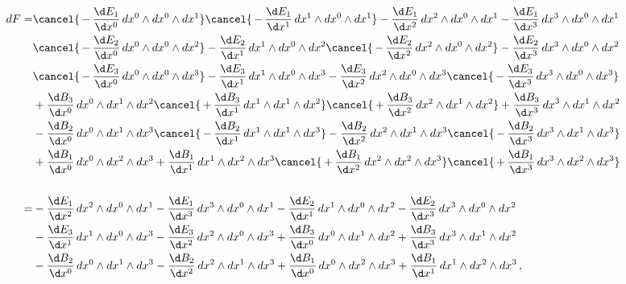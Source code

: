  \begin{align*}
 	dF =
 	&\cancel{\, - \, \frac{\d E_1}{\d x^0} \, dx^0 \wedge dx^0 \wedge dx^1} \cancel{\, - \, \frac{\d E_1}{\d x^1} \, dx^1 \wedge dx^0 \wedge dx^1}
 	 - \frac{\d E_1}{\d x^2} \, dx^2 \wedge dx^0 \wedge dx^1 - \frac{\d E_1}{\d x^3} \, dx^3 \wedge dx^0 \wedge dx^1
 	\\
 	&\cancel{\, - \, \frac{\d E_2}{\d x^0} \, dx^0 \wedge dx^0 \wedge dx^2} - \frac{\d E_2}{\d x^1} \, dx^1 \wedge dx^0 \wedge dx^2
 	 \cancel{\, - \, \frac{\d E_2}{\d x^2} \, dx^2 \wedge dx^0 \wedge dx^2} - \frac{\d E_2}{\d x^3} \, dx^3 \wedge dx^0 \wedge dx^2
 	\\
 	&\cancel{\, - \, \frac{\d E_3}{\d x^0} \, dx^0 \wedge dx^0 \wedge dx^3} - \frac{\d E_3}{\d x^1} \, dx^1 \wedge dx^0 \wedge dx^3
 	 - \frac{\d E_3}{\d x^2} \, dx^2 \wedge dx^0 \wedge dx^3 \cancel{\, - \, \frac{\d E_3}{\d x^3} \, dx^3 \wedge dx^0 \wedge dx^3}
 	\\
 	&+ \frac{\d B_3}{\d x^0} \, dx^0 \wedge dx^1 \wedge dx^2 \cancel{\, + \, \frac{\d B_3}{\d x^1} \, dx^1 \wedge dx^1 \wedge dx^2}
 	 \cancel{\, + \, \frac{\d B_3}{\d x^2} \, dx^2 \wedge dx^1 \wedge dx^2} + \frac{\d B_3}{\d x^3} \, dx^3 \wedge dx^1 \wedge dx^2
 	\\
 	&- \frac{\d B_2}{\d x^0} \, dx^0 \wedge dx^1 \wedge dx^3 \cancel{\, - \, \frac{\d B_2}{\d x^1} \, dx^1 \wedge dx^1 \wedge dx^3}
 	 - \frac{\d B_2}{\d x^2} \, dx^2 \wedge dx^1 \wedge dx^3 \cancel{\, - \, \frac{\d B_2}{\d x^3} \, dx^3 \wedge dx^1 \wedge dx^3}
 	\\
 	&+ \frac{\d B_1}{\d x^0} \, dx^0 \wedge dx^2 \wedge dx^3 + \frac{\d B_1}{\d x^1} \, dx^1 \wedge dx^2 \wedge dx^3
 	 \cancel{\, + \, \frac{\d B_1}{\d x^2} \, dx^2 \wedge dx^2 \wedge dx^3} \cancel{\, + \, \frac{\d B_1}{\d x^3} \, dx^3 \wedge dx^2 \wedge dx^3}
 	\\
 	\\
 	=
 	&- \frac{\d E_1}{\d x^2} \, dx^2 \wedge dx^0 \wedge dx^1 - \frac{\d E_1}{\d x^3} \, dx^3 \wedge dx^0 \wedge dx^1
 	 - \frac{\d E_2}{\d x^1} \, dx^1 \wedge dx^0 \wedge dx^2 - \frac{\d E_2}{\d x^3} \, dx^3 \wedge dx^0 \wedge dx^2
 	\\
 	&- \frac{\d E_3}{\d x^1} \, dx^1 \wedge dx^0 \wedge dx^3 - \frac{\d E_3}{\d x^2} \, dx^2 \wedge dx^0 \wedge dx^3
 	 + \frac{\d B_3}{\d x^0} \, dx^0 \wedge dx^1 \wedge dx^2 + \frac{\d B_3}{\d x^3} \, dx^3 \wedge dx^1 \wedge dx^2
 	\\
 	&- \frac{\d B_2}{\d x^0} \, dx^0 \wedge dx^1 \wedge dx^3 - \frac{\d B_2}{\d x^2} \, dx^2 \wedge dx^1 \wedge dx^3
 	 + \frac{\d B_1}{\d x^0} \, dx^0 \wedge dx^2 \wedge dx^3 + \frac{\d B_1}{\d x^1} \, dx^1 \wedge dx^2 \wedge dx^3 \, , 
 \end{align*}
